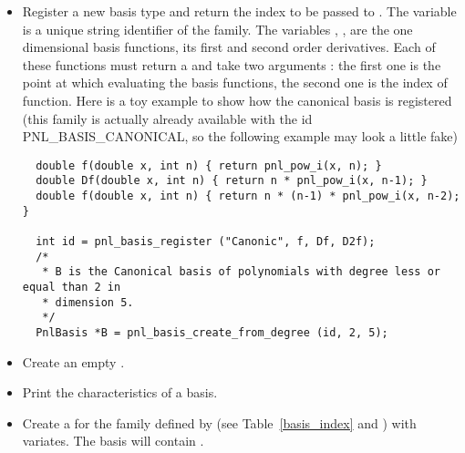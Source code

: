 \begin{itemize}
\item {}
\sshortdescribe Register a new basis type and return the index to be passed to
 . The variable  is a unique
string identifier of the family. The variables , ,  are
the one dimensional basis functions, its first and second order derivatives.
Each of these functions must return a  and take two arguments : the
first one is the point at which evaluating the basis functions, the second one
is the index of function. Here is a toy example to show how the canonical basis
is registered (this family is actually already available with the id
PNL_BASIS_CANONICAL, so the following example may look a little fake)
\begin{verbatim}
  double f(double x, int n) { return pnl_pow_i(x, n); }
  double Df(double x, int n) { return n * pnl_pow_i(x, n-1); }
  double f(double x, int n) { return n * (n-1) * pnl_pow_i(x, n-2); }

  int id = pnl_basis_register ("Canonic", f, Df, D2f);
  /*
   * B is the Canonical basis of polynomials with degree less or equal than 2 in
   * dimension 5.
   */
  PnlBasis *B = pnl_basis_create_from_degree (id, 2, 5);
  \end{verbatim}

\item {}
  \sshortdescribe Create an empty \PnlBasis.

\item {}
  \sshortdescribe Print the characteristics of a basis.
  
  
\item {}
  \sshortdescribe Create a \PnlBasis for the family
  defined by  (see Table~\ref{basis_index} and
  ) with 
  variates. The basis will contain .


\end{itemize}
